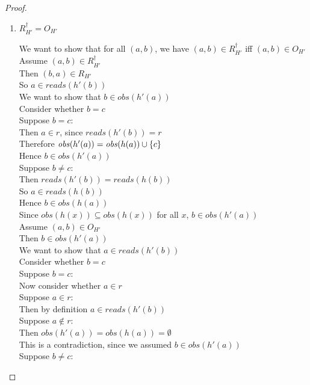 \begin{proof}
\begin{enumerate}
\item $R^\dagger_{H'} = O_{H'}$ 
  \begin{tabbedproof}
    \oo We want to show that for all $(a,b)$, we have $(a,b) \in R^\dagger_{H'}$ iff $(a,b) \in O_{H'}$ \\
    \oo Assume $(a,b) \in R^\dagger_{H'}$ \\
    \ooo Then $(b, a) \in R_{H'}$ \\
    \ooo So $a \in \mathit{reads}(h'(b))$ \\
    \ooo We want to show that $b \in \mathit{obs}(h'(a))$ \\
    \ooo Consider whether $b = c$ \\
    \ooo Suppose $b = c$: \\
    \oooo Then $a \in r$, since $\mathit{reads}(h'(b)) = r$ \\
    \oooo Therefore $\mathit{obs}(h'(a)) = \mathit{obs}(h(a)) \cup \{{c}\}$ \\
    \oooo Hence $b \in \mathit{obs}(h'(a))$ \\
    \ooo Suppose $b \not= c$: \\
    \oooo Then $\mathit{reads}(h'(b)) = \mathit{reads}(h(b))$ \\
    \oooo So $a \in \mathit{reads}(h(b))$ \\
    \oooo Hence $b \in \mathit{obs}(h(a))$ \\
    \oooo Since $\mathit{obs}(h(x)) \subseteq \mathit{obs}(h(x))$ for all $x$, $b \in \mathit{obs}(h'(a))$ \\
    \oo Assume $(a,b) \in O_{H'}$ \\
    \ooo Then $b \in \mathit{obs}(h'(a))$ \\
    \ooo We want to show that $a \in \mathit{reads}(h'(b))$ \\
    \ooo Consider whether $b = c$ \\
    \ooo Suppose $b = c$: \\
    \oooo Now consider whether $a \in r$ \\
    \oooo Suppose $a \in r$: \\
    \ooooo Then by definition $a \in \mathit{reads}(h'(b))$ \\
    \oooo Suppose $a \not\in r$: \\
    \ooooo Then $\mathit{obs}(h'(a)) = \mathit{obs}(h(a)) = \emptyset$ \\
    \ooooo This is a contradiction, since we assumed $b \in \mathit{obs}(h'(a))$ \\
    \ooo Suppose $b \not= c$: \\

\end{tabbedproof}
\end{enumerate}
\end{proof}
